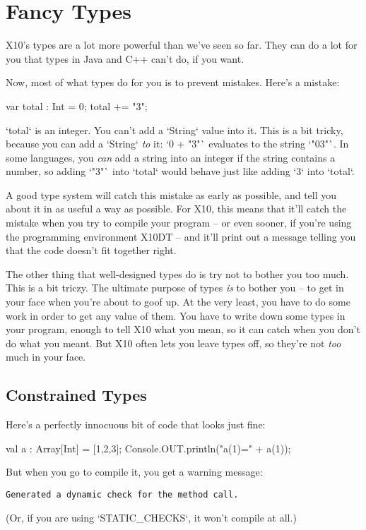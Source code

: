 \chapter{Fancy Types}

X10's types are a lot more powerful than we've seen so far.  They can do a lot
for you that types in Java and C++ can't do, if you want.   

Now, most of what types do for you is to prevent mistakes.  Here's a mistake: 
\begin{xten}
var total : Int = 0; 
total += "3";
\end{xten}
\xcd`total` is an integer.  You can't add a \xcd`String` value into it. 
This is a bit tricky, because you can add a \xcd`String` {\em to} it: 
\xcd`0 + "3"` evaluates to the string \xcd`"03"`.  In some languages, you {\em
can} add a string into an integer if the string contains a number, so adding
\xcd`"3"` into \xcd`total` would behave just like adding \xcd`3` into
\xcd`total`.  

A good type system will catch this mistake as early as possible, and tell you
about it in as useful a way as possible.  For X10, this means that it'll catch
the mistake when you try to compile your program -- or even sooner, if you're
using the programming environment X10DT -- and it'll print out a message
telling you that the code doesn't fit together right.   

The other thing that well-designed types do is try not to bother you too much.
This is a bit triczy. The ultimate purpose of types {\em is} to bother you --
to get in your face when you're about to goof up. At the very least, you have
to do some work in order to get any value of them. You have to write down some
types in your program, enough to tell X10 what you mean, so it can catch when
you don't do what you meant.  But X10 often lets you leave types off, so
they're not {\em too} much in your face.




\section{Constrained Types}

Here's a perfectly innocuous bit of code that looks just fine: 
\begin{xtennum}[]
val a : Array[Int] = [1,2,3];
Console.OUT.println("a(1)=" + a(1));
\end{xtennum}
But when you go to compile it, you get a warning message: 
\begin{verbatim}
Generated a dynamic check for the method call.
\end{verbatim}
(Or, if you are using \xcd`STATIC_CHECKS`, it won't compile at all.)  

